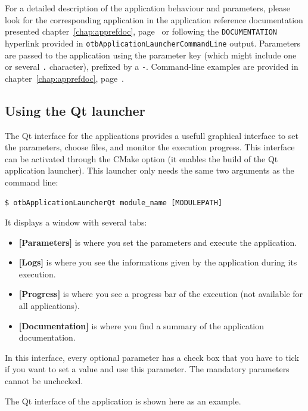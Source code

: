 For a detailed description of the application behaviour and
parameters, please look for the corresponding application in the
application reference documentation presented
chapter~\ref{chap:apprefdoc}, page~\pageref{chap:apprefdoc} or
following the \verb?DOCUMENTATION? hyperlink provided in
\verb?otbApplicationLauncherCommandLine? output. Parameters are passed
to the application using the parameter key (which might include one or
several \verb?.? character), prefixed by a \verb?-?. Command-line
examples are provided in chapter~\ref{chap:apprefdoc},
page~\pageref{chap:apprefdoc}.

\subsection{Using the Qt launcher}
The Qt interface for the applications provides a usefull graphical interface
to set the parameters, choose files, and monitor the execution progress. 
This interface can be activated through the CMake option  
(it enables the build of the Qt application launcher). This launcher 
only needs the same two arguments as the command line:
\begin{verbatim}
$ otbApplicationLauncherQt module_name [MODULEPATH]
\end{verbatim}

It displays a window with several tabs:
\begin{itemize}
\item \textbf{[Parameters]} is where you set the parameters and 
execute the application. 
\item \textbf{[Logs]} is where you see the informations given by 
the application during its execution. 
\item \textbf{[Progress]} is where you see a progress bar of the 
execution (not available for all applications). 
\item \textbf{[Documentation]} is where you find a summary of the 
application documentation.
\end{itemize}

In this interface, every optional parameter has a check box that
you have to tick if you want to set a value and use this parameter.
The mandatory parameters cannot be unchecked.
 
The Qt interface of the application  is shown 
here as an example.

